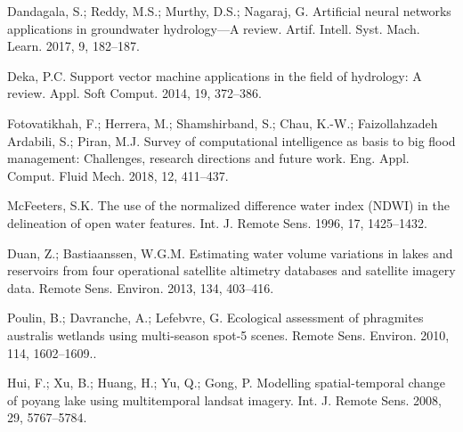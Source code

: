 \documentclass[12pt, a4paper]{report}
\begin{document}
\begin{thebibliography}{widest entry}
Dandagala, S.; Reddy, M.S.; Murthy, D.S.; Nagaraj, G. Artificial neural networks applications in groundwater hydrology—A review. Artif. Intell. Syst. Mach. Learn. 2017, 9, 182–187.

Deka, P.C. Support vector machine applications in the field of hydrology: A review. Appl. Soft Comput. 2014,
19, 372–386.

Fotovatikhah, F.; Herrera, M.; Shamshirband, S.; Chau, K.-W.; Faizollahzadeh Ardabili, S.; Piran, M.J. Survey of computational intelligence as basis to big flood management: Challenges, research directions and future work. Eng. Appl. Comput. Fluid Mech. 2018, 12, 411–437. 

McFeeters, S.K. The use of the normalized difference water index (NDWI) in the delineation of open water features. Int. J. Remote Sens. 1996, 17, 1425–1432.

Duan, Z.; Bastiaanssen, W.G.M. Estimating water volume variations in lakes and reservoirs from four operational satellite altimetry databases and satellite imagery data. Remote Sens. Environ. 2013, 134, 403–416.

Poulin, B.; Davranche, A.; Lefebvre, G. Ecological assessment of phragmites australis wetlands using multi-season spot-5 scenes. Remote Sens. Environ. 2010, 114, 1602–1609..

Hui, F.; Xu, B.; Huang, H.; Yu, Q.; Gong, P. Modelling spatial-temporal change of poyang lake using multitemporal landsat imagery. Int. J. Remote Sens. 2008, 29, 5767–5784.

\end{thebibliography}






\end{document}

